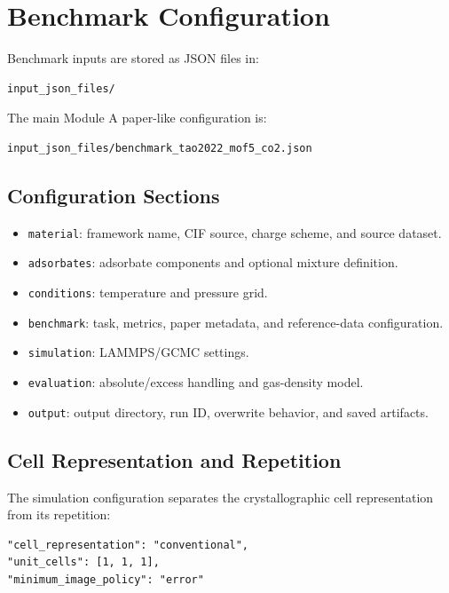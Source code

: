 \section{Benchmark Configuration}

Benchmark inputs are stored as JSON files in:

\begin{lstlisting}
input_json_files/
\end{lstlisting}

The main Module A paper-like configuration is:

\begin{lstlisting}
input_json_files/benchmark_tao2022_mof5_co2.json
\end{lstlisting}

\subsection{Configuration Sections}

\begin{itemize}
    \item \texttt{material}: framework name, CIF source, charge scheme, and source dataset.
    \item \texttt{adsorbates}: adsorbate components and optional mixture definition.
    \item \texttt{conditions}: temperature and pressure grid.
    \item \texttt{benchmark}: task, metrics, paper metadata, and reference-data configuration.
    \item \texttt{simulation}: LAMMPS/GCMC settings.
    \item \texttt{evaluation}: absolute/excess handling and gas-density model.
    \item \texttt{output}: output directory, run ID, overwrite behavior, and saved artifacts.
\end{itemize}

\subsection{Cell Representation and Repetition}

The simulation configuration separates the crystallographic cell representation from its repetition:

\begin{lstlisting}
"cell_representation": "conventional",
"unit_cells": [1, 1, 1],
"minimum_image_policy": "error"
\end{lstlisting}

